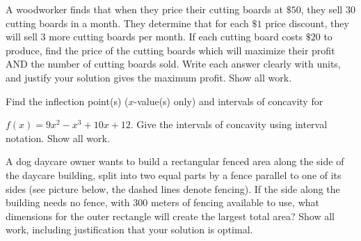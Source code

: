 \documentclass[addpoints,12pt]{exam}
\begin{document}
\begin{questions}
\newpage

\question[11] A woodworker finds that when they price their cutting boards at $\$50 $, they sell
$30$ cutting boards in a month. They determine that for each $\$1 $ price discount, they will sell
3 more cutting boards per month. If each cutting board costs $\$20$ to produce, find the price of
the cutting boards which will maximize their profit AND the number of cutting boards sold. Write
each answer clearly with units, and justify your solution gives the maximum profit. Show all
work.




\newpage

\question





\newpage

\question[8]
Find the inflection point(s) ($x$-value(s) only) and intervals of concavity for

$f(x)=9x^2-x^3+10x+12$. Give the intervals of concavity using interval notation. Show all work.

\newpage


\question[11] A dog daycare owner wants to build a rectangular fenced area along the side of
the daycare building, split into two equal parts by a fence parallel to one of its sides (see picture
below, the dashed lines denote fencing). If the side along the building needs no fence,
with 300 meters of fencing available to use, what dimensions for the outer rectangle will create
the largest total area? Show all work, including justification that your solution is optimal.


\end{questions}
\end{document}
